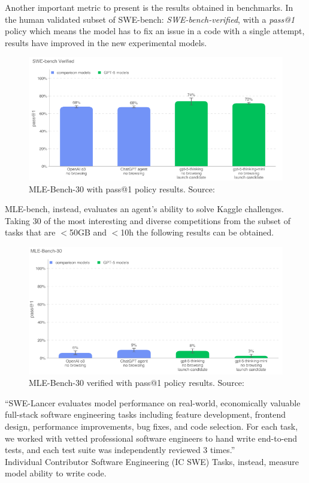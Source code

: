 \documentclass[12pt]{article}
\begin{document}
Another important metric to present is the results obtained in benchmarks. In the human validated subset of SWE-bench: \textit{SWE-bench-verified}, with a \textit{pass@1} policy which means the model has to fix an issue in a code with a single attempt, results have improved in the new experimental models.
    \begin{figure}[H]
    \centering
            \includegraphics[width=1\textwidth]{SWE-bench-verifiedChatGPT.png}
    \caption[GPT-5 MLE-Bench-30]{MLE-Bench-30 with pass@1 policy results. Source: \cite{OpenAIGPT-5SystemCard}}
    \end{figure}
MLE-bench, instead, evaluates an agent's ability to solve Kaggle challenges. Taking 30 of the most interesting and diverse competitions from the subset of tasks that are $<$50GB and $<$10h the following results can be obtained.
    \begin{figure}[H]
    \centering
            \includegraphics[width=1\textwidth]{MLE-bench-30ChatGPT.png}
    \caption[GPT-5 MLE-Bench-30 verified]{MLE-Bench-30 verified with pass@1 policy results. Source: \cite{OpenAIGPT-5SystemCard}}
    \end{figure}
``SWE-Lancer evaluates model performance on real-world, economically valuable full-stack software engineering tasks including feature development, frontend design, performance improvements, bug fixes, and code selection. For each task, we worked with vetted professional software engineers to hand write end-to-end tests, and each test suite was independently reviewed 3 times.''\cite{OpenAIGPT-5SystemCard}\\
Individual Contributor Software Engineering (IC SWE) Tasks, instead, measure model ability to write code.
\end{document}
